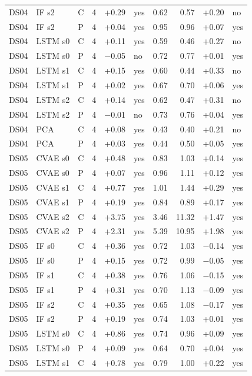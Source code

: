 \documentclass[10pt]{article}
\begin{document}
{\begin{longtable}{lllrrlrrrl}
DS04 & IF s2 & C & 4 & +0.29 & yes & 0.62 & 0.57 & +0.20 & no \\
DS04 & IF s2 & P & 4 & +0.04 & yes & 0.95 & 0.96 & +0.07 & yes \\
DS04 & LSTM s0 & C & 4 & +0.11 & yes & 0.59 & 0.46 & +0.27 & no \\
DS04 & LSTM s0 & P & 4 & −0.05 & no & 0.72 & 0.77 & +0.01 & yes \\
DS04 & LSTM s1 & C & 4 & +0.15 & yes & 0.60 & 0.44 & +0.33 & no \\
DS04 & LSTM s1 & P & 4 & +0.02 & yes & 0.67 & 0.70 & +0.06 & yes \\
DS04 & LSTM s2 & C & 4 & +0.14 & yes & 0.62 & 0.47 & +0.31 & no \\
DS04 & LSTM s2 & P & 4 & −0.01 & no & 0.73 & 0.76 & +0.04 & yes \\
DS04 & PCA & C & 4 & +0.08 & yes & 0.43 & 0.40 & +0.21 & no \\
DS04 & PCA & P & 4 & +0.03 & yes & 0.44 & 0.50 & +0.05 & yes \\
\midrule
DS05 & CVAE s0 & C & 4 & +0.48 & yes & 0.83 & 1.03 & +0.14 & yes \\
DS05 & CVAE s0 & P & 4 & +0.07 & yes & 0.96 & 1.11 & +0.12 & yes \\
DS05 & CVAE s1 & C & 4 & +0.77 & yes & 1.01 & 1.44 & +0.29 & yes \\
DS05 & CVAE s1 & P & 4 & +0.19 & yes & 0.84 & 0.89 & +0.17 & yes \\
DS05 & CVAE s2 & C & 4 & +3.75 & yes & 3.46 & 11.32 & +1.47 & yes \\
DS05 & CVAE s2 & P & 4 & +2.31 & yes & 5.39 & 10.95 & +1.98 & yes \\
DS05 & IF s0 & C & 4 & +0.36 & yes & 0.72 & 1.03 & −0.14 & yes \\
DS05 & IF s0 & P & 4 & +0.15 & yes & 0.72 & 0.99 & −0.05 & yes \\
DS05 & IF s1 & C & 4 & +0.38 & yes & 0.76 & 1.06 & −0.15 & yes \\
DS05 & IF s1 & P & 4 & +0.31 & yes & 0.70 & 1.13 & −0.09 & yes \\
DS05 & IF s2 & C & 4 & +0.35 & yes & 0.65 & 1.08 & −0.17 & yes \\
DS05 & IF s2 & P & 4 & +0.19 & yes & 0.74 & 1.03 & +0.01 & yes \\
DS05 & LSTM s0 & C & 4 & +0.86 & yes & 0.74 & 0.96 & +0.09 & yes \\
DS05 & LSTM s0 & P & 4 & +0.09 & yes & 0.64 & 0.70 & +0.04 & yes \\
DS05 & LSTM s1 & C & 4 & +0.78 & yes & 0.79 & 1.00 & +0.22 & yes \\

\end{longtable}}
\end{document}
